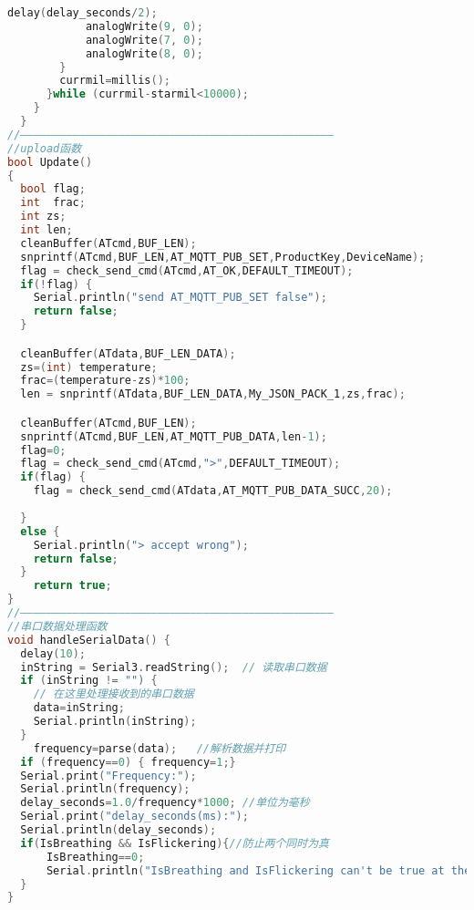 \documentclass[12pt,hyperref,a4paper,UTF8]{ctexart}
\begin{document}
\begin{lstlisting}[language=C++]
            delay(delay_seconds/2);
            analogWrite(9, 0);
            analogWrite(7, 0);
            analogWrite(8, 0);   
        }
        currmil=millis();
      }while (currmil-starmil<10000);
    }
  }
//————————————————————————————————————————————————
//upload函数
bool Update()
{
  bool flag;
  int  frac;
  int zs;
  int len;
  cleanBuffer(ATcmd,BUF_LEN);
  snprintf(ATcmd,BUF_LEN,AT_MQTT_PUB_SET,ProductKey,DeviceName);
  flag = check_send_cmd(ATcmd,AT_OK,DEFAULT_TIMEOUT);
  if(!flag) {
    Serial.println("send AT_MQTT_PUB_SET false");
    return false;
  }

  cleanBuffer(ATdata,BUF_LEN_DATA);
  zs=(int) temperature;
  frac=(temperature-zs)*100;
  len = snprintf(ATdata,BUF_LEN_DATA,My_JSON_PACK_1,zs,frac);

  cleanBuffer(ATcmd,BUF_LEN);
  snprintf(ATcmd,BUF_LEN,AT_MQTT_PUB_DATA,len-1);
  flag=0;
  flag = check_send_cmd(ATcmd,">",DEFAULT_TIMEOUT);
  if(flag) {
    flag = check_send_cmd(ATdata,AT_MQTT_PUB_DATA_SUCC,20);
    
  } 
  else {
    Serial.println("> accept wrong");
    return false;
  }
    return true;
}
//————————————————————————————————————————————————
//串口数据处理函数
void handleSerialData() {
  delay(10);
  inString = Serial3.readString();  // 读取串口数据
  if (inString != "") {
    // 在这里处理接收到的串口数据
    data=inString;
    Serial.println(inString);
  }
    frequency=parse(data);   //解析数据并打印
  if (frequency==0) { frequency=1;}
  Serial.print("Frequency:");
  Serial.println(frequency);  
  delay_seconds=1.0/frequency*1000; //单位为毫秒
  Serial.print("delay_seconds(ms):");
  Serial.println(delay_seconds);
  if(IsBreathing && IsFlickering){//防止两个同时为真
      IsBreathing==0;
      Serial.println("IsBreathing and IsFlickering can't be true at the same time,set IsBreathing to false");
  }
}

\end{lstlisting}

\end{document}
